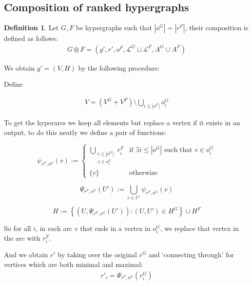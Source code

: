 \documentclass[12pt]{article}
\theoremstyle{definition}
\newtheorem{definition}[theorem]{Definition}
\newcommand{\defeq}{\vcentcolon=}
\newcommand{\1}{\mathbbm{1}}
\renewcommand{\L}{\mathcal{L}}
\begin{document}
\subsection{Composition of ranked hypergraphs}
\begin{definition}\label{def_seq_comp}
Let $G, F$ be hypergraphs such that $|o^G| = |r^F|$, their composition is defined as follows:
\begin{align}
    G\otimes F = (g', r', o^F, \L^G\sqcup \L^F, A^G\cup A^F)
\end{align}

We obtain $g' = (V,H)$ by the following procedure:

Define 

\begin{align*}
    V = (V^G + V^F) \setminus \bigcup_{i\leq |o^G|}o^G_i
\end{align*}

To get the hyperarcs we keep all elements but replace a vertex if it exists in an output, to do this neatly we define a pair of functions:

\[
\psi_{r^F, o^G}(v) := 
\begin{cases}
\displaystyle\bigcup_{\substack{i\leq |o^G| \\ v \in o^G_i}} r^F_i & \text{if } \exists i \leq |o^G| \text{ such that } v \in o^G_i \\
\{v\} & \text{otherwise}
\end{cases}
\]

\[
\Psi_{r^F, o^G}(U') := \bigcup_{v \in U'} \psi_{r^F, o^G}(v)
\]

\[
H := \left\{ \left(U, \Psi_{r^F, o^G}(U')\right) : (U, U') \in H^G \right\} \cup H^F
\]

So for all $i$, in each arc $v$ that ends in a vertex in $o_i^G$, we replace that vertex in the arc with $r_i^F$. 

And we obtain $r'$ by taking over the original $r^G$ and `connecting through' for vertices which are both minimal and maximal:
\begin{align*}
    r'_i = \Psi_{r^F, o^G}(r^G_i)
\end{align*}
\end{definition}
\end{document}
